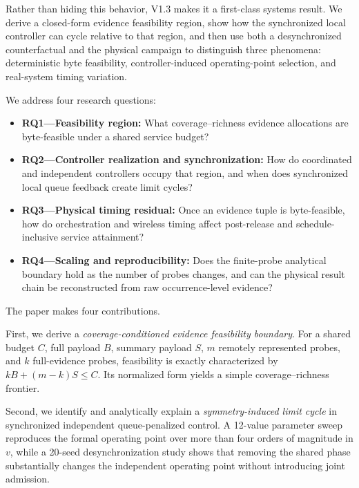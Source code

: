 \documentclass[10pt,journal]{IEEEtran}
\begin{document}
Rather than hiding this behavior, V1.3 makes it a first-class systems
result. We derive a closed-form evidence feasibility region, show how
the synchronized local controller can cycle relative to that region,
and then use both a desynchronized counterfactual and the physical
campaign to distinguish three phenomena: deterministic byte feasibility,
controller-induced operating-point selection, and real-system timing
variation.

We address four research questions:

\begin{itemize}[leftmargin=1.25em]
\item \textbf{RQ1---Feasibility region:}
What coverage--richness evidence allocations are byte-feasible under a
shared service budget?

\item \textbf{RQ2---Controller realization and synchronization:}
How do coordinated and independent controllers occupy that region, and
when does synchronized local queue feedback create limit cycles?

\item \textbf{RQ3---Physical timing residual:}
Once an evidence tuple is byte-feasible, how do orchestration and
wireless timing affect post-release and schedule-inclusive service
attainment?

\item \textbf{RQ4---Scaling and reproducibility:}
Does the finite-probe analytical boundary hold as the number of probes
changes, and can the physical result chain be reconstructed from raw
occurrence-level evidence?
\end{itemize}

The paper makes four contributions.

First, we derive a \emph{coverage-conditioned evidence feasibility
boundary}. For a shared budget $C$, full payload $B$, summary payload
$S$, $m$ remotely represented probes, and $k$ full-evidence probes,
feasibility is exactly characterized by
$kB+(m-k)S\leq C$. Its normalized form yields a simple
coverage--richness frontier.

Second, we identify and analytically explain a
\emph{symmetry-induced limit cycle} in synchronized independent
queue-penalized control. A 12-value parameter sweep reproduces the
formal operating point over more than four orders of magnitude in $v$,
while a 20-seed desynchronization study shows that removing the shared
phase substantially changes the independent operating point without
introducing joint admission.
\end{document}
